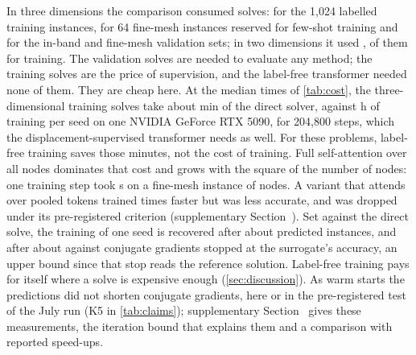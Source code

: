 In three dimensions the comparison consumed \numThreeSolves{} solves: \numThreeTrainSolves{}
for the 1,024 labelled training instances, \numThreeFewSolves{} for 64 fine-mesh instances
reserved for few-shot training and \numThreeEvalSolves{} for the in-band and fine-mesh
validation sets; in two dimensions it used \numCmSolves{}, \numCmSolvesTrain{} of them for
training. The validation solves are needed to evaluate any method; the training solves are
the price of supervision, and the label-free transformer needed none of them. They are cheap
here. At the median times of \cref{tab:cost}, the \numThreeTrainSolves{} three-dimensional
training solves take about \numCostLabelMin{} min of the direct solver, against
\numTimeThreeSeed{} h of training per seed on one NVIDIA GeForce RTX 5090, for 204,800
steps, which the displacement-supervised transformer needs as well. For these problems,
label-free training saves those minutes, not the cost of training. Full self-attention over
all nodes dominates that cost and grows with the square of the number of nodes: one training
step took \numEtwoTransformerFineStep{} s on a fine-mesh instance of \numEtwoNodesFine{}
nodes. A variant that attends over pooled tokens trained \numTimeBottleneckSpeedup{} times
faster but was less accurate, and was dropped under its pre-registered criterion
(supplementary Section~\SuppSide{}). Set against the direct solve, the training of one seed
is recovered after about \numCostBreakEvenDirect{} predicted instances, and after about
\numCostBreakEvenMatch{} against conjugate gradients stopped at the surrogate's accuracy, an
upper bound since that stop reads the reference solution. Label-free training pays for
itself where a solve is expensive enough (\cref{sec:discussion}). As warm starts the
predictions did not shorten conjugate gradients, here or in the pre-registered test of the
July run (K5 in \cref{tab:claims}); supplementary Section~\SuppWarm{} gives these
measurements, the iteration bound that explains them and a comparison with reported
speed-ups.

